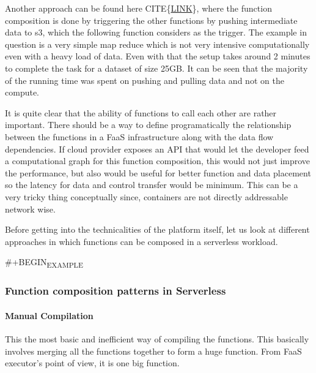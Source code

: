 \documentclass[12pt,titlepage]{article}
\begin{document}
Another approach can be found here CITE\{\href{https://aws.amazon.com/blogs/compute/ad-hoc-big-data-processing-made-simple-with-serverless-mapreduce/}{LINK}\}, where the function composition is
done by triggering the other functions by pushing intermediate data to s3, which
the following function considers as the trigger. The example in question is a
very simple map reduce which is not very intensive computationally even with a
heavy load of data. Even with that the setup takes around 2 minutes to complete
the task for a dataset of size 25GB. It can be seen that the majority of the
running time was spent on pushing and pulling data and not on the compute.

It is quite clear that the ability of functions to call each other are rather
important. There should be a way to define programatically the relationship
between the functions in a FaaS infrastructure along with the data flow
dependencies. If cloud provider exposes an API that would let the developer feed
a computational graph for this function composition, this would not just
improve the performance, but also would be useful for better function and data
placement so the latency for data and control transfer would be minimum. This
can be a very tricky thing conceptually since, containers are not directly
addressable network wise.

Before getting into the technicalities of the platform itself, let us look at
different approaches in which functions can be composed in a serverless
workload.

\#+BEGIN\textsubscript{EXAMPLE}
\subsubsection{Function composition patterns in Serverless}
\label{sec:org25bc2eb}
\paragraph{Manual Compilation}
\label{sec:org29acd45}

This the most basic and inefficient way of compiling the functions. This
basically involves merging all the functions together to form a huge function.
From FaaS executor's point of view, it is one big function.
\end{document}
